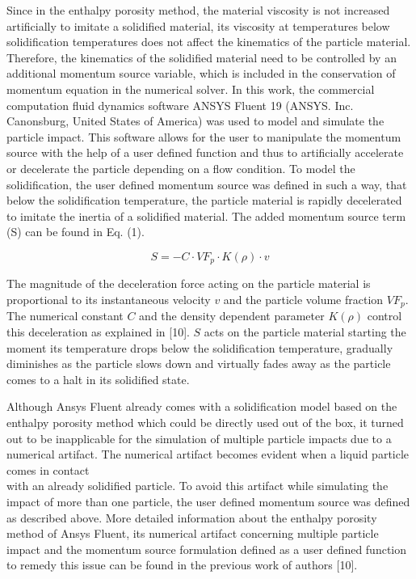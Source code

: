 \documentclass[10pt]{article}
\begin{document}
Since in the enthalpy porosity method, the material viscosity is not increased artificially to imitate a solidified material, its viscosity at temperatures below solidification temperatures does not affect the kinematics of the particle material. Therefore, the kinematics of the solidified material need to be controlled by an additional momentum source variable, which is included in the conservation of momentum equation in the numerical solver. In this work, the commercial computation fluid dynamics software ANSYS Fluent 19 (ANSYS. Inc. Canonsburg, United States of America) was used to model and simulate the particle impact. This software allows for the user to manipulate the momentum source with the help of a user defined function and thus to artificially accelerate or decelerate the particle depending on a flow condition. To model the solidification, the user defined momentum source was defined in such a way, that below the solidification temperature, the particle material is rapidly decelerated to imitate the inertia of a solidified material. The added momentum source term (S) can be found in Eq. (1).


\begin{equation*}
S=-C \cdot V F_{p} \cdot K(\rho) \cdot v \tag{1}
\end{equation*}


The magnitude of the deceleration force acting on the particle material is proportional to its instantaneous velocity $v$ and the particle volume fraction $V F_{p}$. The numerical constant $C$ and the density dependent parameter $K(\rho)$ control this deceleration as explained in [10]. $S$ acts on the particle material starting the moment its temperature drops below the solidification temperature, gradually diminishes as the particle slows down and virtually fades away as the particle comes to a halt in its solidified state.

Although Ansys Fluent already comes with a solidification model based on the enthalpy porosity method which could be directly used out of the box, it turned out to be inapplicable for the simulation of multiple particle impacts due to a numerical artifact. The numerical artifact becomes evident when a liquid particle comes in contact\\
with an already solidified particle. To avoid this artifact while simulating the impact of more than one particle, the user defined momentum source was defined as described above. More detailed information about the enthalpy porosity method of Ansys Fluent, its numerical artifact concerning multiple particle impact and the momentum source formulation defined as a user defined function to remedy this issue can be found in the previous work of authors [10].
\end{document}

